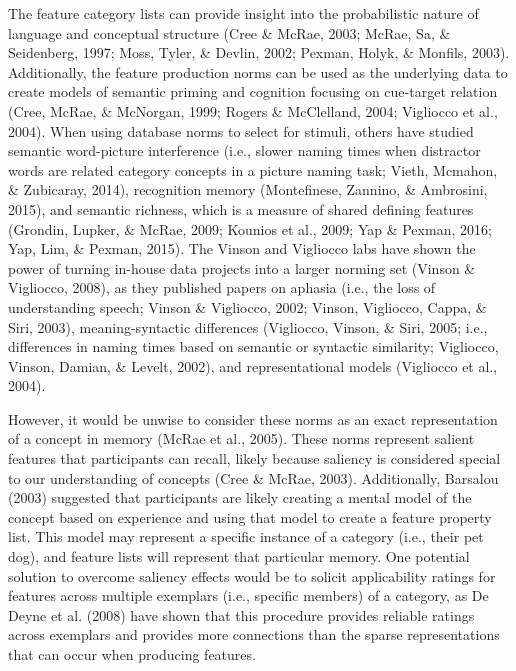 \documentclass[english,,man]{apa6}
\theoremstyle{definition}
\theoremstyle{definition}
\theoremstyle{definition}
\theoremstyle{remark}
\begin{document}
The feature category lists can provide insight into the probabilistic
nature of language and conceptual structure (Cree \& McRae, 2003; McRae,
Sa, \& Seidenberg, 1997; Moss, Tyler, \& Devlin, 2002; Pexman, Holyk, \&
Monfils, 2003). Additionally, the feature production norms can be used
as the underlying data to create models of semantic priming and
cognition focusing on cue-target relation (Cree, McRae, \& McNorgan,
1999; Rogers \& McClelland, 2004; Vigliocco et al., 2004). When using
database norms to select for stimuli, others have studied semantic
word-picture interference (i.e., slower naming times when distractor
words are related category concepts in a picture naming task; Vieth,
Mcmahon, \& Zubicaray, 2014), recognition memory (Montefinese, Zannino,
\& Ambrosini, 2015), and semantic richness, which is a measure of shared
defining features (Grondin, Lupker, \& McRae, 2009; Kounios et al.,
2009; Yap \& Pexman, 2016; Yap, Lim, \& Pexman, 2015). The Vinson and
Vigliocco labs have shown the power of turning in-house data projects
into a larger norming set (Vinson \& Vigliocco, 2008), as they published
papers on aphasia (i.e., the loss of understanding speech; Vinson \&
Vigliocco, 2002; Vinson, Vigliocco, Cappa, \& Siri, 2003),
meaning-syntactic differences (Vigliocco, Vinson, \& Siri, 2005; i.e.,
differences in naming times based on semantic or syntactic similarity;
Vigliocco, Vinson, Damian, \& Levelt, 2002), and representational models
(Vigliocco et al., 2004).

However, it would be unwise to consider these norms as an exact
representation of a concept in memory (McRae et al., 2005). These norms
represent salient features that participants can recall, likely because
saliency is considered special to our understanding of concepts (Cree \&
McRae, 2003). Additionally, Barsalou (2003) suggested that participants
are likely creating a mental model of the concept based on experience
and using that model to create a feature property list. This model may
represent a specific instance of a category (i.e., their pet dog), and
feature lists will represent that particular memory. One potential
solution to overcome saliency effects would be to solicit applicability
ratings for features across multiple exemplars (i.e., specific members)
of a category, as De Deyne et al. (2008) have shown that this procedure
provides reliable ratings across exemplars and provides more connections
than the sparse representations that can occur when producing features.
\end{document}
